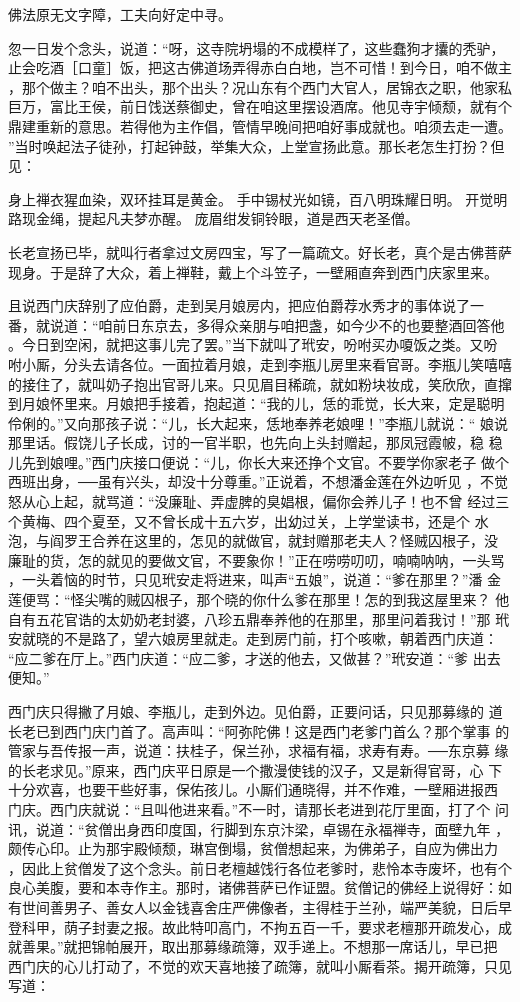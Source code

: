 佛法原无文字障，工夫向好定中寻。

忽一日发个念头，说道：“呀，这寺院坍塌的不成模样了，这些蠢狗才攮的秃驴，
止会吃酒［口童］饭，把这古佛道场弄得赤白白地，岂不可惜！到今日，咱不做主
，那个做主？咱不出头，那个出头？况山东有个西门大官人，居锦衣之职，他家私
巨万，富比王侯，前日饯送蔡御史，曾在咱这里摆设酒席。他见寺宇倾颓，就有个
鼎建重新的意思。若得他为主作倡，管情早晚间把咱好事成就也。咱须去走一遭。
”当时唤起法子徒孙，打起钟鼓，举集大众，上堂宣扬此意。那长老怎生打扮？但
见：

身上禅衣猩血染，双环挂耳是黄金。
手中锡杖光如镜，百八明珠耀日明。
开觉明路现金绳，提起凡夫梦亦醒。
庞眉绀发铜铃眼，道是西天老圣僧。

长老宣扬已毕，就叫行者拿过文房四宝，写了一篇疏文。好长老，真个是古佛菩萨
现身。于是辞了大众，着上禅鞋，戴上个斗笠子，一壁厢直奔到西门庆家里来。

且说西门庆辞别了应伯爵，走到吴月娘房内，把应伯爵荐水秀才的事体说了一
番，就说道：“咱前日东京去，多得众亲朋与咱把盏，如今少不的也要整酒回答他
。今日到空闲，就把这事儿完了罢。”当下就叫了玳安，吩咐买办嗄饭之类。又吩
咐小厮，分头去请各位。一面拉着月娘，走到李瓶儿房里来看官哥。李瓶儿笑嘻嘻
的接住了，就叫奶子抱出官哥儿来。只见眉目稀疏，就如粉块妆成，笑欣欣，直撺
到月娘怀里来。月娘把手接着，抱起道：“我的儿，恁的乖觉，长大来，定是聪明
伶俐的。”又向那孩子说：“儿，长大起来，恁地奉养老娘哩！”李瓶儿就说：“
娘说那里话。假饶儿子长成，讨的一官半职，也先向上头封赠起，那凤冠霞帔，稳
稳儿先到娘哩。”西门庆接口便说：“儿，你长大来还挣个文官。不要学你家老子
做个西班出身，──虽有兴头，却没十分尊重。”正说着，不想潘金莲在外边听见
，不觉怒从心上起，就骂道：“没廉耻、弄虚脾的臭娼根，偏你会养儿子！也不曾
经过三个黄梅、四个夏至，又不曾长成十五六岁，出幼过关，上学堂读书，还是个
水泡，与阎罗王合养在这里的，怎见的就做官，就封赠那老夫人？怪贼囚根子，没
廉耻的货，怎的就见的要做文官，不要象你！”正在唠唠叨叨，喃喃呐呐，一头骂
，一头着恼的时节，只见玳安走将进来，叫声“五娘”，说道：“爹在那里？”潘
金莲便骂：“怪尖嘴的贼囚根子，那个晓的你什么爹在那里！怎的到我这屋里来？
他自有五花官诰的太奶奶老封婆，八珍五鼎奉养他的在那里，那里问着我讨！”那
玳安就晓的不是路了，望六娘房里就走。走到房门前，打个咳嗽，朝着西门庆道：
“应二爹在厅上。”西门庆道：“应二爹，才送的他去，又做甚？”玳安道：“爹
出去便知。”

西门庆只得撇了月娘、李瓶儿，走到外边。见伯爵，正要问话，只见那募缘的
道长老已到西门庆门首了。高声叫：“阿弥陀佛！这是西门老爹门首么？那个掌事
的管家与吾传报一声，说道：扶桂子，保兰孙，求福有福，求寿有寿。──东京募
缘的长老求见。”原来，西门庆平日原是一个撒漫使钱的汉子，又是新得官哥，心
下十分欢喜，也要干些好事，保佑孩儿。小厮们通晓得，并不作难，一壁厢进报西
门庆。西门庆就说：“且叫他进来看。”不一时，请那长老进到花厅里面，打了个
问讯，说道：“贫僧出身西印度国，行脚到东京汴梁，卓锡在永福禅寺，面壁九年
，颇传心印。止为那宇殿倾颓，琳宫倒塌，贫僧想起来，为佛弟子，自应为佛出力
，因此上贫僧发了这个念头。前日老檀越饯行各位老爹时，悲怜本寺废坏，也有个
良心美腹，要和本寺作主。那时，诸佛菩萨已作证盟。贫僧记的佛经上说得好：如
有世间善男子、善女人以金钱喜舍庄严佛像者，主得桂于兰孙，端严美貌，日后早
登科甲，荫子封妻之报。故此特叩高门，不拘五百一千，要求老檀那开疏发心，成
就善果。”就把锦帕展开，取出那募缘疏簿，双手递上。不想那一席话儿，早已把
西门庆的心儿打动了，不觉的欢天喜地接了疏簿，就叫小厮看茶。揭开疏簿，只见
写道：

